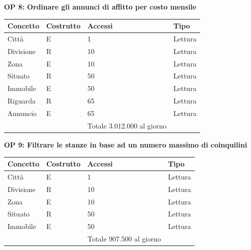 \documentclass[a4paper,12pt]{report}
\begin{document}
            \textbf{OP 8: Ordinare gli annunci di affitto per costo mensile}
        	\begin{table}[H]
            \centering
             \begin{tabular}{||l l l l||}
             \hline
             Concetto & Costrutto & Accessi & Tipo \\ [0.5ex] 
             \hline\hline
             Città & E & 1 & Lettura \\ 
             Divisione & R & 10 & Lettura \\ 
             Zona & E & 10 & Lettura \\ 
             Situato & R & 50 & Lettura \\ 
             Immobile & E & 50 & Lettura \\ 
             Riguarda & R & 65 & Lettura \\ 
             Annuncio & E & 65 & Lettura \\ 
             \hline
                &   & Totale  3.012.000 al giorno &  \\ [1ex] 
             \hline
             \end{tabular}
            \end{table}

            \textbf{OP 9: Filtrare le stanze in base ad un numero massimo di coinquilini}
        	\begin{table}[H]
            \centering
             \begin{tabular}{||l l l l||}
             \hline
             Concetto & Costrutto & Accessi & Tipo \\ [0.5ex] 
             \hline\hline
             Città & E & 1 & Lettura \\ 
             Divisione & R & 10 & Lettura \\ 
             Zona & E & 10 & Lettura \\ 
             Situato & R & 50 & Lettura \\ 
             Immobile & E & 50 & Lettura \\ 
             \hline
                &   & Totale  907.500 al giorno &  \\ [1ex] 
             \hline
             \end{tabular}
            \end{table}
\end{document}
